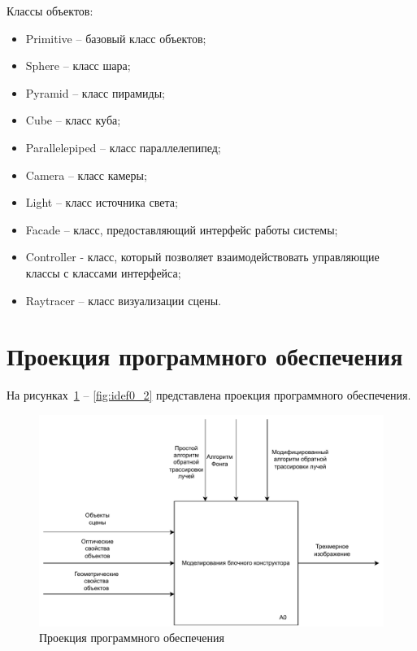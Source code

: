 Классы объектов:
\begin{itemize}
	\item Primitive -- базовый класс объектов;
	\item Sphere -- класс шара;
	\item Pyramid -- класс пирамиды;
	\item Cube -- класс куба;
	\item Parallelepiped -- класс параллелепипед;
	\item Camera -- класс камеры;
	\item Light -- класс источника света;
	\item Facade -- класс, предоставляющий интерфейс работы системы;
	\item Controller - класс, который позволяет взаимодействовать управляющие классы с классами интерфейса;
	\item Raytracer -- класс визуализации сцены.
\end{itemize}

\section{Проекция программного обеспечения}

На рисунках~\ref{fig:idef0_1} -- \ref{fig:idef0_2} представлена проекция программного обеспечения.
\begin{figure}[h]
	\begin{center}
		\includegraphics[width=\linewidth]{photos/idef0_1.pdf}
	\end{center}
	\caption{Проекция программного обеспечения}
	\label{fig:idef0_1}
\end{figure}
\clearpage

